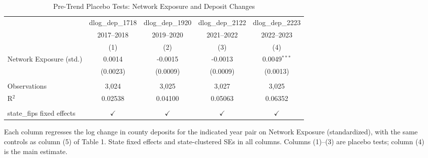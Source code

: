\begin{table}[htbp]
   \caption{\label{tab:placebo} Pre-Trend Placebo Tests: Network Exposure and Deposit Changes}
   \bigskip
   \centering
   \footnotesize\begin{tabular}{lcccc}
      \toprule
                                 & dlog\_dep\_1718   & dlog\_dep\_1920   & dlog\_dep\_2122   & dlog\_dep\_2223\\    
                                 & 2017--2018        & 2019--2020        & 2021--2022        & 2022--2023 \\   
                                 & (1)               & (2)               & (3)               & (4)\\  
      \midrule 
      Network Exposure (std.)    & 0.0014            & -0.0015           & -0.0013           & 0.0049$^{***}$\\   
                                 & (0.0023)          & (0.0009)          & (0.0009)          & (0.0013)\\   
       \\
      Observations               & 3,024             & 3,025             & 3,027             & 3,025\\  
      R$^2$                      & 0.02538           & 0.04100           & 0.05063           & 0.06352\\  
       \\
      state\_fips fixed effects  & $\checkmark$      & $\checkmark$      & $\checkmark$      & $\checkmark$\\   
      \bottomrule
   \end{tabular}
   
   \par \raggedright 
   Each column regresses the log change in county deposits for the indicated year pair on Network Exposure (standardized), with the same controls as column (5) of Table 1. State fixed effects and state-clustered SEs in all columns. Columns (1)--(3) are placebo tests; column (4) is the main estimate.
\end{table}
